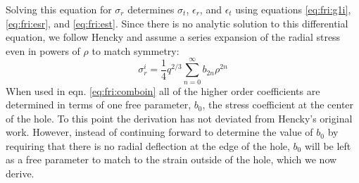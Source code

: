 Solving this equation for $\sigma_r$ determines $\sigma_t$, $\epsilon_r$, and $\epsilon_t$ using equations \ref{eq:fri:g1i}, \ref{eq:fri:esr}, and \ref{eq:fri:est}.
Since there is no analytic solution to this differential equation, we follow Hencky and assume a series expansion of the radial stress even in powers of $\rho$ to match symmetry:
\begin{equation}
	\sigma_r^i=\frac{1}{4} q^{2/3} \sum_{n=0}^{\infty} b_{2n} \rho^{2n}
\end{equation}
When used in eqn. \ref{eq:fri:comboin} all of the higher order coefficients are determined in terms of one free parameter, $b_0$, the stress coefficient at the center of the hole.
To this point the derivation has not deviated from Hencky's original work.
However, instead of continuing forward to determine the value of $b_0$ by requiring that there is no radial deflection at the edge of the hole, $b_0$ will be left as a free parameter to match to the strain outside of the hole, which we now derive.

